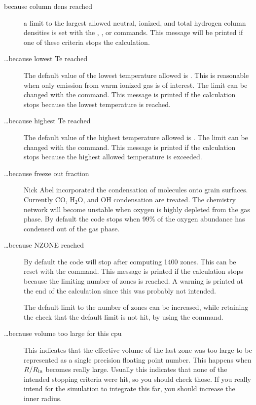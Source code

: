 \begin{description}
\item[ because column dens reached]  a limit to the largest allowed neutral,
ionized, and total hydrogen column densities is set with the , , or 
commands.  This message will be printed if one of these criteria stops the
calculation.

\item[\dots because lowest Te reached]  The default value of the lowest
temperature allowed is \TempStopDefault.  This is reasonable when only emission from
warm ionized gas is of interest.  The limit can be changed with the
 command.  This message is printed if the calculation stops
because the lowest temperature is reached.

\item[\dots because highest Te reached]  The default value of the highest
temperature allowed is \TempLimitHigh.  The limit can be changed with the
 command.  This message is printed if the calculation
stops because the highest allowed temperature is exceeded.

\item[\dots because freeze out fraction]  Nick Abel incorporated the
condensation of molecules onto grain surfaces. Currently CO, H$_2$O, and OH
condensation are treated. The chemistry network will become unstable when
oxygen is highly depleted from the gas phase.  By default the code stops
when 99\% of the oxygen abundance has condensed out of the gas phase.

\item[\dots because NZONE reached]  By default the code will stop after computing
1400 zones.  This can be reset with the  command.  This message
is printed if the calculation stops because the limiting number of zones
is reached.  A warning is printed at the end of the calculation since this
was probably not intended.

The default limit to the number of zones can be increased, while retaining
the check that the default limit is not hit, by using the  command.

\item[\dots because volume too large for this cpu] This indicates that the
 effective volume of the last zone was too large to be represented as a single
 precision floating point number. This happens when $R/R_{\rm in}$ becomes
 really large. Usually this indicates that none of the intended stopping
 criteria were hit, so you should check those. If you really intend for the
 simulation to integrate this far, you should increase the inner radius.


\end{description}
